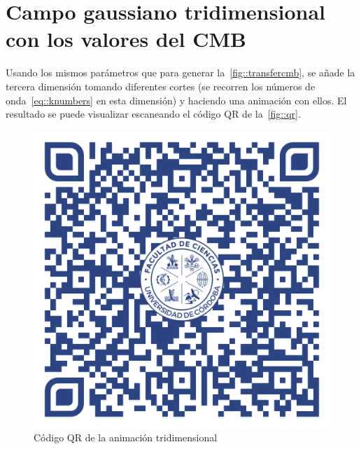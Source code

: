 \section{Campo gaussiano tridimensional con los valores del CMB}
Usando los mismos parámetros que para generar la~\autoref{fig::transfercmb}, se añade la tercera dimensión tomando diferentes cortes (se recorren los números de onda~\eqref{eq::knumbers} en esta dimensión) y haciendo una animación con ellos. El resultado se puede visualizar escaneando el código QR de la~\autoref{fig::qr}.
\begin{figure}[h]
    \centering
    \includegraphics[scale=.075]{svg/qrgif.pdf}
    \caption{Código QR de la animación tridimensional}
    \label{fig::qr}
\end{figure}